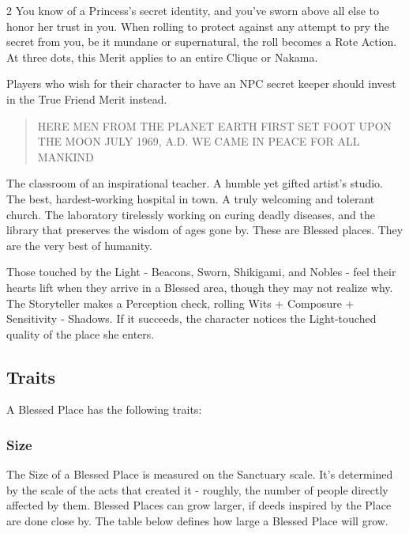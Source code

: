 \begin{multicols}{2}
\noindent You know of a Princess's secret identity, and you've sworn above all else to honor her trust in you. When rolling to protect against any attempt to pry the secret from you, be it mundane or supernatural, the roll becomes a Rote Action. At three dots, this Merit applies to an entire Clique or Nakama. 

Players who wish for their character to have an NPC secret keeper should invest in the True Friend Merit instead. 


\begin{quote}
HERE MEN FROM THE PLANET EARTH FIRST SET FOOT UPON THE MOON
JULY 1969, A.D.
WE CAME IN PEACE FOR ALL MANKIND
 \end{quote}
 
The classroom of an inspirational teacher. A humble yet gifted artist's studio. The best, hardest-working hospital in town. A truly welcoming and tolerant church. The laboratory tirelessly working on curing deadly diseases, and the library that preserves the wisdom of ages gone by. These are Blessed places. They are the very best of humanity.
 
Those touched by the Light - Beacons, Sworn, Shikigami, and Nobles - feel their hearts lift when they arrive in a Blessed area, though they may not realize why. The Storyteller makes a Perception check, rolling Wits + Composure + Sensitivity - Shadows. If it succeeds, the character notices the Light-touched quality of the place she enters.
 
\subsection*{Traits}

A Blessed Place has the following traits:

\subsubsection*{Size}

The Size of a Blessed Place is measured on the Sanctuary scale. It’s determined by the scale of the acts that created it - roughly, the number of people directly affected by them. Blessed Places can grow larger, if deeds inspired by the Place are done close by. The table below defines how large a Blessed Place will grow. 


\end{multicols}
